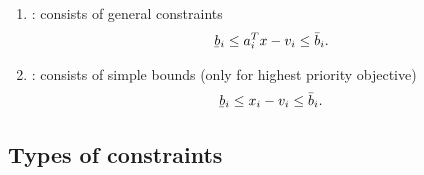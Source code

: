 \documentclass[12pt,a4paper]{article}
\newcommand{\ubar}[1]{\underaccent{\bar}{#1}}
\begin{document}
\begin{enumerate}
\item {}: consists of general constraints
%
  \begin{align} \label{eq.ctr}
    \ubar{b}_i \leq a_i^Tx -v_i \leq \bar{b}_i.
  \end{align}

\item {}: consists of simple bounds (only for highest priority objective)
%
  \begin{align} \label{eq.simple_bounds}
    \ubar{b}_i \leq x_i - v_i \leq \bar{b}_i.
  \end{align}

\end{enumerate}

\subsection{Types of constraints}
\end{document}
